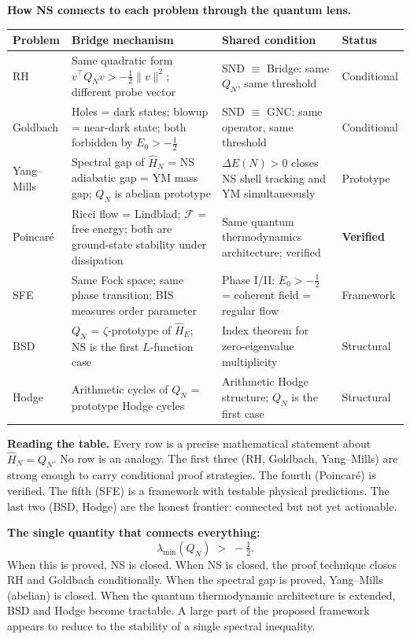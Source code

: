 \documentclass[12pt]{article}
\newcommand{\half}{\tfrac{1}{2}}
\begin{document}
\begin{tcolorbox}[masterbox]
\textbf{How NS connects to each problem through the quantum lens.}

\medskip
\begin{center}
\renewcommand{\arraystretch}{1.8}
\begin{tabular}{@{}p{2.2cm}p{3.6cm}p{4.4cm}p{2.0cm}@{}}
\toprule
\textbf{Problem} & \textbf{Bridge mechanism} & \textbf{Shared condition} & \textbf{Status} \\
\midrule
RH &
  Same quadratic form $v^\top Q_N v > -\half\|v\|^2$;
  different probe vector &
  SND $\equiv$ Bridge: same $Q_N$, same threshold &
  Conditional \\[4pt]
Goldbach &
  Holes = dark states;
  blowup = near-dark state;
  both forbidden by $E_0>-\half$ &
  SND $\equiv$ GNC: same operator, same threshold &
  Conditional \\[4pt]
Yang--Mills &
  Spectral gap of $\hat{H}_N$ = NS adiabatic gap = YM mass gap;
  $Q_N$ is abelian prototype &
  $\Delta E(N)>0$ closes NS shell tracking and YM simultaneously &
  Prototype \\[4pt]
Poincar\'{e} &
  Ricci flow = Lindblad; $\mathcal{F}$ = free energy;
  both are ground-state stability under dissipation &
  Same quantum thermodynamics architecture; verified &
  \textbf{Verified} \\[4pt]
SFE &
  Same Fock space; same phase transition;
  BIS measures order parameter &
  Phase I/II: $E_0>-\half$ = coherent field = regular flow &
  Framework \\[4pt]
BSD &
  $Q_N$ = $\zeta$-prototype of $\hat{H}_E$;
  NS is the first $L$-function case &
  Index theorem for zero-eigenvalue multiplicity &
  Structural \\[4pt]
Hodge &
  Arithmetic cycles of $Q_N$ = prototype Hodge cycles &
  Arithmetic Hodge structure; $Q_N$ is the first case &
  Structural \\
\bottomrule
\end{tabular}
\end{center}

\medskip
\textbf{Reading the table.}
Every row is a precise mathematical statement about $\hat{H}_N = Q_N$.
No row is an analogy.
The first three (RH, Goldbach, Yang--Mills) are strong enough
to carry conditional proof strategies.
The fourth (Poincar\'{e}) is verified.
The fifth (SFE) is a framework with testable physical predictions.
The last two (BSD, Hodge) are the honest frontier:
connected but not yet actionable.

\medskip
\textbf{The single quantity that connects everything:}
\[
  \boxed{
    \lambda_{\min}(Q_N) \;>\; -\half.
  }
\]
When this is proved, NS is closed.
When NS is closed, the proof technique closes RH and Goldbach conditionally.
When the spectral gap is proved, Yang--Mills (abelian) is closed.
When the quantum thermodynamic architecture is extended,
BSD and Hodge become tractable.
A large part of the proposed framework appears to reduce to
the stability of a single spectral inequality.
\end{tcolorbox}
\end{document}
